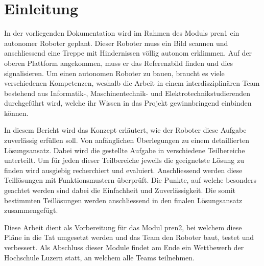 \section{Einleitung}
In der vorliegenden Dokumentation wird im Rahmen des Moduls \acrfull{pren1} ein autonomer Roboter geplant. Dieser Roboter muss ein Bild scannen und anschliessend eine Treppe mit Hindernissen völlig autonom erklimmen. Auf der oberen Plattform angekommen, muss er das Referenzbild finden und dies signalisieren.
Um einen autonomen Roboter zu bauen, braucht es viele verschiedenen Kompetenzen, weshalb die Arbeit in einem interdisziplinären Team bestehend aus Informatik-, Maschinentechnik- und Elektrotechnikstudierenden durchgeführt wird, welche ihr Wissen in das Projekt gewinnbringend einbinden können.

In diesem Bericht wird das Konzept erläutert, wie der Roboter diese Aufgabe zuverlässig erfüllen soll. Von anfänglichen Überlegungen zu einem detaillierten Lösungsansatz. Dabei wird die gestellte Aufgabe in verschiedene Teilbereiche unterteilt. Um für jeden dieser Teilbereiche jeweils die geeignetste Lösung zu finden wird ausgiebig recherchiert und evaluiert. Anschliessend werden diese Teillösungen mit Funktionsmustern überprüft.
Die Punkte, auf welche besonders geachtet werden sind dabei die Einfachheit und Zuverlässigkeit.
Die somit bestimmten Teillösungen werden anschliessend in den finalen Lösungsansatz zusammengefügt. 

Diese Arbeit dient als Vorbereitung für das Modul  \acrfull{pren2}, bei welchem diese Pläne in die Tat umgesetzt werden und das Team den Roboter baut, testet und verbessert. Als Abschluss dieser Module findet am Ende ein Wettbewerb der Hochschule Luzern statt, an welchem alle Teams teilnehmen.

